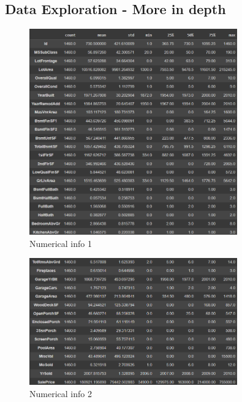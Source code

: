 \subsection{Data Exploration - More in depth}
\label{sec:data_exploration_more_in_depth}


\begin{figure}[h!]
    \centering
    \includegraphics[width=0.8\textwidth]{imgs/info1.png}
    \caption{Numerical info 1}
    \label{fig:info1}
\end{figure}
\newpage
\begin{figure}[h!]
    \centering
    \includegraphics[width=0.8\textwidth]{imgs/info2.png}
    \caption{Numerical info 2}
    \label{fig:info2}
\end{figure}
\newpage
